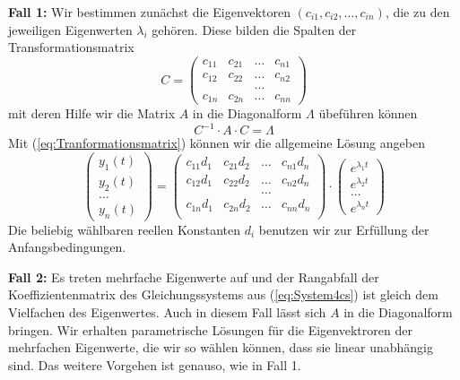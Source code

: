 \textbf{Fall 1: }Wir bestimmen zunächst die Eigenvektoren $(c_{i1}, c_{i2},
\dots, c_{in})$, die zu den jeweiligen Eigenwerten $\lambda_i$ gehören. Diese
bilden die Spalten der Transformationsmatrix 
\begin{equation}
  C=\begin{pmatrix}
    c_{11}&c_{21}&\dots&c_{n1}\\
    c_{12}&c_{22}&\dots&c_{n2}\\
    &&\dots&\\
    c_{1n}&c_{2n}&\dots&c_{nn}
  \end{pmatrix}
  \label{eq:Tranformationsmatrix}
\end{equation}
mit deren Hilfe wir die Matrix $A$ in die Diagonalform $\Lambda$ übeführen können
\begin{equation}
  C^{-1}\cdot A\cdot C=\Lambda
\end{equation}
Mit (\ref{eq:Tranformationsmatrix}) können wir die allgemeine Lösung angeben
\begin{equation}
  \begin{pmatrix}y_1(t)\\y_2(t)\\\dots\\y_n(t)\end{pmatrix}=
  \begin{pmatrix}
    c_{11}d_1&c_{21}d_2&\dots&c_{n1}d_n\\
    c_{12}d_1&c_{22}d_2&\dots&c_{n2}d_n\\
    &&\dots&\\
    c_{1n}d_1&c_{2n}d_2&\dots&c_{nn}d_n\\
  \end{pmatrix}\cdot
  \begin{pmatrix}e^{\lambda_1t}\\e^{\lambda_2t}\\\dots\\e^{\lambda_nt}\end{pmatrix}
  \label{eq:LsgAllgFall1}
\end{equation}
Die beliebig wählbaren reellen Konstanten $d_i$ benutzen wir zur Erfüllung der
Anfangsbedingungen.

\textbf{Fall 2: }Es treten mehrfache Eigenwerte auf und der Rangabfall der
Koeffizientenmatrix des Gleichungssystems aus (\ref{eq:System4cs}) ist gleich
dem Vielfachen des Eigenwertes. Auch in diesem Fall lässt sich $A$ in die
Diagonalform bringen. Wir erhalten parametrische Lösungen für die
Eigenvektroren der mehrfachen Eigenwerte, die wir so wählen können, dass sie
linear unabhängig sind. Das weitere Vorgehen ist genauso, wie in Fall 1.

